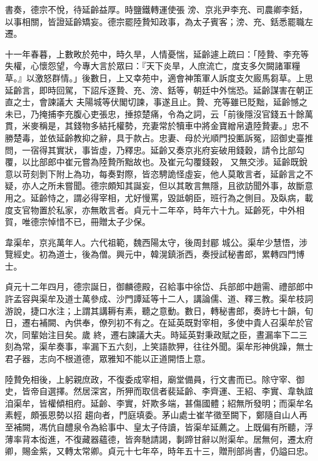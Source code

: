 \begin{pinyinscope}
 書奏，德宗不悅，待延齡益厚。時鹽鐵轉運使張
 滂、京兆尹李充、司農卿李銛，以事相關，皆證延齡矯妄。德宗罷陸贄知政事，為太子賓客；滂、充、銛悉罷職左遷。



 十一年春暮，上數畋於苑中，時久旱，人情憂惴，延齡遽上疏曰：「陸贄、李充等失權，心懷怨望，今專大言於眾曰：『天下炎旱，人庶流亡，度支多欠闕諸軍糧草。』以激怒群情。」後數日，上又幸苑中，適會神策軍人訴度支欠廄馬芻草。上思延齡言，即時回駕，下詔斥逐贄、充、滂、銛等，朝廷中外惴恐。延齡謀害在朝正直之士，會諫議大
 夫陽城等伏閣切諫，事遂且止。贄、充等雖已貶黜，延齡憾之未已，乃掩捕李充腹心吏張忠，捶掠楚痛，令為之詞，云「前後隱沒官錢五十餘萬貫，米麥稱是，其錢物多結托權勢，充妻常於犢車中將金寶繒帛遺陸贄妻。」忠不勝楚毒，並依延齡教抑之辭，具于款占。忠妻、母於光順門投匭訴冤，詔御史臺推問，一宿得其實狀，事皆虛，乃釋忠。延齡又奏京兆府妄破用錢穀，請令比部勾覆，以比部郎中崔元嘗為陸贄所黜故也。及崔元勾覆錢穀，
 又無交涉。延齡既銳意以苛刻剝下附上為功，每奏對際，皆恣騁詭怪虛妄，他人莫敢言者，延齡言之不疑，亦人之所未嘗聞。德宗頗知其誕妄，但以其敢言無隱，且欲訪聞外事，故斷意用之。延齡恃之，謂必得宰相，尤好慢罵，毀詆朝臣，班行為之側目。及臥病，載度支官物置於私家，亦無敢言者。貞元十二年卒，時年六十九。延齡死，中外相賀，唯德宗悼惜不已，冊贈太子少保。



 韋渠牟，京兆萬年人。六代祖範，魏西陽太守，後周封郿
 城公。渠牟少慧悟，涉覽經史。初為道士，後為僧。興元中，韓滉鎮浙西，奏授試秘書郎，累轉四門博士。



 貞元十二年四月，德宗誕日，御麟德殿，召給事中徐岱、兵部郎中趙需、禮部郎中許孟容與渠牟及道士萬參成、沙門譚延等十二人，講論儒、道、釋三教。渠牟枝詞游說，捷口水注；上謂其講耨有素，聽之意動。數日，轉秘書郎，奏詩七十韻，旬日，遷右補闕、內供奉，僚列初不有之。在延英既對宰相，多使中貴人召渠牟於官次，同輩始注目矣。歲
 終，遷右諫議大夫。時延英對秉政賦之臣，晝漏率下二三刻為常，渠牟奏事，率漏下五六刻，上笑語款狎，往往外聞。渠牟形神佻躁，無士君子器，志向不根道德，眾雅知不能以正道開悟上意。



 陸贄免相後，上躬親庶政，不復委成宰相，廟堂備員，行文書而已。除守宰、御史，皆帝自選擇。然居深宮，所狎而取信者裴延齡、李齊運、王紹、李實、韋執誼洎渠牟，皆權傾相府。延齡、李實，奸欺多端，甚傷國體；紹無所發明；而渠牟名素輕，頗張恩勢以招
 趨向者，門庭填委。茅山處士崔芊徵至闕下，鄭隨自山人再至補闕，馮伉自醴泉令為給事中、皇太子侍讀，皆渠牟延薦之。上既偏有所聽，浮薄率背本衒進，不復藏器蘊德，皆奔馳請謁，剚蹄甘辭以附渠牟。居無何，遷太府卿，賜金紫，又轉太常卿。貞元十七年卒，時年五十三，贈刑部尚書，仍謚曰忠。




\end{pinyinscope}

